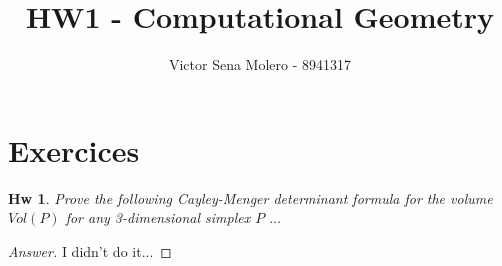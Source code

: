 \documentclass[12pt]{article}
\begin{document}
 
\newcommand{\N}{\mathbb{N}}
\newcommand{\Z}{\mathbb{Z}}
 
\setcounter{exCounter}{0}
\newtheorem{ex}[exCounter]{Hw}

\setcounter{lemaCounter}{0}
\newtheorem{lema}[lemaCounter]{Lemma}

\newenvironment{problem}[2][Hw]{\begin{trivlist}
\item[\hskip \labelsep {\bfseries #1}\hskip \labelsep {\bfseries #2.}]}{\end{trivlist}}
\linespread{2}
 
 
 
\title{HW1 - Computational Geometry}
\author{Victor Sena Molero - 8941317}
\maketitle



\section{Exercices}
\begin{ex}
Prove the following Cayley-Menger determinant formula for the volume $Vol(P)$ for any 3-dimensional simplex $P$ $\dots$
\end{ex}

\begin{proof}[Answer]
I didn't do it...
\end{proof}
\end{document}
